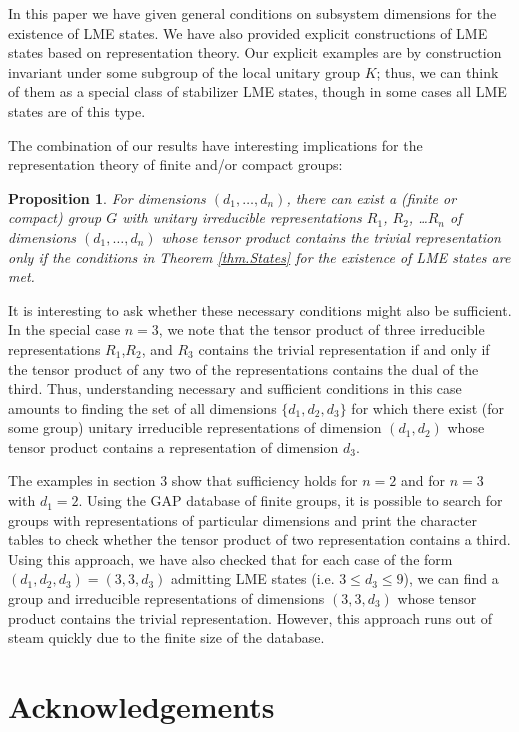 \documentclass[12pt]{article}
\newtheorem{proposition}[theorem]{Proposition}
\theoremstyle{definition}
\begin{document}
In this paper we have given general conditions on subsystem dimensions for the existence of LME states. We have also provided explicit constructions of LME states based on representation theory. Our explicit examples are by construction invariant under some subgroup of the local unitary group $K$; thus, we can think of them as a special class of stabilizer LME states, though in some cases all LME states are of this type. 

The combination of our results have interesting implications for the representation theory of finite and/or compact groups:
\begin{proposition}
For dimensions $(d_1, \dots, d_n)$, there can exist a (finite or compact) group $G$ with unitary irreducible representations $R_1$, $R_2$, \dots $R_n$  of dimensions $(d_1, \dots, d_n)$ whose tensor product contains the trivial representation only if the conditions in Theorem \ref{thm.States} for the existence of LME states are met.
\end{proposition}
It is interesting to ask whether these necessary conditions might also be sufficient. In the special case $n=3$, we note that the tensor product of three irreducible representations $R_1$,$R_2$, and $R_3$ contains the trivial representation if and only if the tensor product of any two of the representations contains the dual of the third. Thus, understanding necessary and sufficient conditions in this case amounts to finding the set of all dimensions $\{d_1, d_2, d_3\}$ for which there exist (for some group) unitary irreducible representations  of dimension $(d_1,d_2)$ whose tensor product contains a representation of dimension $d_3$.

The examples in section 3 show that sufficiency holds for $n=2$ and for $n=3$ with $d_1 = 2$. Using the GAP database of finite groups, it is possible to search for groups with representations of particular dimensions and print the character tables to check whether the tensor product of two representation contains a third. Using this approach, we have also checked that for each case of the form $(d_1,d_2,d_3) = (3,3,d_3)$ admitting LME states (i.e. $3 \le d_3 \le 9$), we can find a group and irreducible representations of dimensions $(3,3,d_3)$ whose tensor product contains the trivial representation. However, this approach runs out of steam quickly due to the finite size of the database.

\section*{Acknowledgements}
\end{document}
